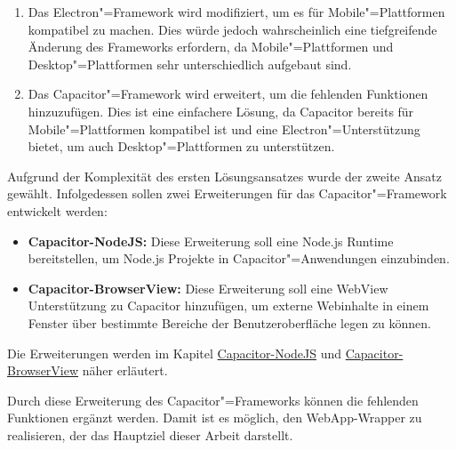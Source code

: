 \begin{enumerate}
  \setlength\itemsep{-0.5em}
  \item
  Das Electron"=Framework wird modifiziert, um es für Mobile"=Plattformen kompatibel zu machen.
  Dies würde jedoch wahrscheinlich eine tiefgreifende Änderung des Frameworks erfordern, da Mobile"=Plattformen und Desktop"=Plattformen sehr unterschiedlich aufgebaut sind.
  \item
  Das Capacitor"=Framework wird erweitert, um die fehlenden Funktionen hinzuzufügen.
  Dies ist eine einfachere Lösung, da Capacitor bereits für Mobile"=Plattformen kompatibel ist und eine Electron"=Unterstützung bietet, um auch Desktop"=Plattformen zu unterstützen.
\end{enumerate}

Aufgrund der Komplexität des ersten Lösungsansatzes wurde der zweite Ansatz gewählt.
Infolgedessen sollen zwei Erweiterungen für das Capacitor"=Framework entwickelt werden:

\begin{itemize}
  \setlength\itemsep{-0.5em}
  \item \textbf{Capacitor-NodeJS:} Diese Erweiterung soll eine Node.js Runtime bereitstellen, um Node.js Projekte in Capacitor"=Anwendungen einzubinden.
  \item \textbf{Capacitor-BrowserView:} Diese Erweiterung soll eine WebView Unterstützung zu Capacitor hinzufügen, um externe Webinhalte in einem Fenster über bestimmte Bereiche der Benutzeroberfläche legen zu können.
\end{itemize}

Die Erweiterungen werden im Kapitel \hyperref[sec:Capacitor-NodeJS]{Capacitor-NodeJS} und \hyperref[sec:Capacitor-BrowserView]{Capacitor-BrowserView} näher erläutert.

Durch diese Erweiterung des Capacitor"=Frameworks können die fehlenden Funktionen ergänzt werden.
Damit ist es möglich, den WebApp-Wrapper zu realisieren, der das Hauptziel dieser Arbeit darstellt.
